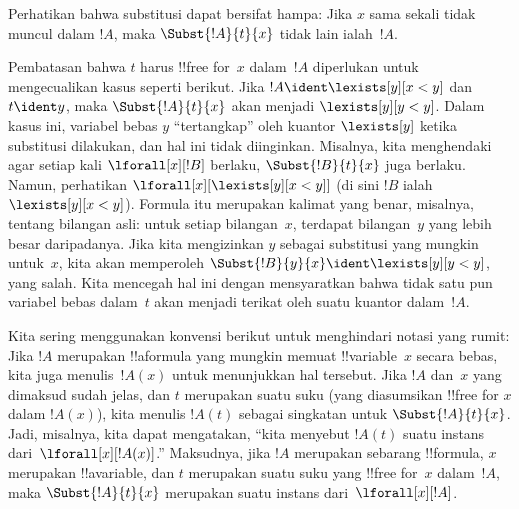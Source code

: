 \documentclass[../../../include/open-logic-section]{subfiles}
\begin{document}
\begin{explain}
Perhatikan bahwa substitusi dapat bersifat hampa: Jika $x$ sama sekali tidak
muncul dalam $!A$, maka $\Subst{!A}{t}{x}$ tidak lain ialah~$!A$.

Pembatasan bahwa $t$ harus !!{free for}~$x$ dalam~$!A$ diperlukan untuk
mengecualikan kasus seperti berikut. Jika $!A \ident \lexists[y][x < y]$
dan $t \ident y$, maka $\Subst{!A}{t}{x}$ akan menjadi $\lexists[y][y <
  y]$. Dalam kasus ini, variabel bebas $y$ ``tertangkap'' oleh kuantor
$\lexists[y]$ ketika substitusi dilakukan, dan hal ini tidak diinginkan.
Misalnya, kita menghendaki agar setiap kali $\lforall[x][!B]$ berlaku,
$\Subst{!B}{t}{x}$ juga berlaku. Namun, perhatikan
$\lforall[x][\lexists[y][x < y]]$ (di sini $!B$ ialah $\lexists[y][x <
  y]$). Formula itu merupakan kalimat yang benar, misalnya, tentang bilangan
asli: untuk setiap bilangan~$x$, terdapat bilangan~$y$ yang lebih besar
daripadanya. Jika kita mengizinkan $y$ sebagai substitusi yang mungkin
untuk~$x$, kita akan memperoleh $\Subst{!B}{y}{x} \ident
\lexists[y][y < y]$, yang salah. Kita mencegah hal ini dengan mensyaratkan
bahwa tidak satu pun variabel bebas dalam~$t$ akan menjadi terikat oleh
suatu kuantor dalam~$!A$.
\end{explain}

Kita sering menggunakan konvensi berikut untuk menghindari notasi yang
rumit: Jika $!A$ merupakan !!a{formula} yang mungkin memuat
!!{variable}~$x$ secara bebas, kita juga menulis~$!A(x)$ untuk menunjukkan
hal tersebut. Jika $!A$ dan~$x$ yang dimaksud sudah jelas, dan $t$
merupakan suatu suku (yang diasumsikan !!{free for} $x$ dalam $!A(x)$),
kita menulis $!A(t)$ sebagai singkatan untuk $\Subst{!A}{t}{x}$. Jadi,
misalnya, kita dapat mengatakan, ``kita menyebut $!A(t)$ suatu instans
dari~$\lforall[x][!A(x)]$.'' Maksudnya, jika $!A$ merupakan sebarang
!!{formula}, $x$ merupakan !!a{variable}, dan $t$ merupakan suatu suku yang
!!{free for}~$x$ dalam~$!A$, maka $\Subst{!A}{t}{x}$ merupakan suatu instans
dari~$\lforall[x][!A]$.
\end{document}

